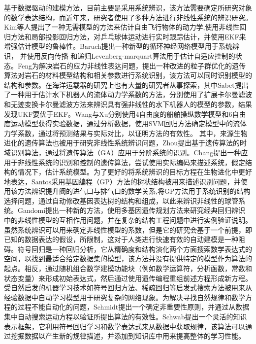 基于数据驱动的建模方法\cite{huang2015trends}，目前主要是采用系统辨识，该方法需要确定所研究对象的数学表达结构，而近年来，研究者使用了多种方法进行非线性系统的辨识研究\cite{deng2009system}。Kim\cite{kim2012estimating}等人提出了一种无需模型的方法来估计自由飞行物体的动力学,使用非线性回归方法和局部投影回归方法，对乒乓球体运动进行实时跟踪估计，并使用EKF来增强估计模型的鲁棒性。Baruch\cite{baruch2009levenberg}提出一种新型的循环神经网络模型用于系统辨识， 并使用反向传播 和递归Levenberg-marquart算法用于估计自适应控制的状态。Feng\cite{feng2006identification}为解决岩石的应力非线性表达问题，提出一种改进的粒子群优化的遗传算法对岩石的材料模型结构和相关参数进行系统识别，该方法可以同时识别模型的结构和参数。在海洋运载器的研究上也有大量的研究者从事探索\cite{luque2011auv,hegrenaes2007comparison,hong2013online}，其中Sabet\cite{sabet2014extended}提出了一种用于估计水下机器人的流体动力学系数的方法，分别使用了扩展卡尔曼滤波和无迹变换卡尔曼滤波方法来辨识具有强非线性的水下机器人的模型的参数，结果发现UKF要优于EKF。Wang\cite{wang2014sensitivity}与Xu\cite{xu2013identification}分别使用4自由度的船舶操纵数学模型和6自由度运动模型获得实验数据，通过分析数据，使用SVM回归方法确定模型中的流体力学系数，通过将预测结果与实际对比，以证明方法的有效性。
其中，来源生物进化的遗传算法也被用于研究非线性系统辨识问题，Zhou提出基于遗传算法的时域识别算法，通过将遗传算法（GA）应用于分阶系统的识别\cite{zhou2013genetic}。Chang提出一种应用于非线性系统的识别和控制的遗传算法，尝试使用实际编码来描述系统，假定结构的情况下，估计系统模型\cite{chang2007nonlinear}。为了更好的将系统辨识的目标方程在生物进化中更好地表达，Santos采用基因编程（GP）方法的树状结构被用来描述识别问题，并使用该方法辨识提升阀的进气口与排气口的数学关系,将GP方法用于系统识别的结构选择问题，通过自动修改基因表达树的结构和组成，以此来辨识非线性的球管系统\cite{dos2014genetic,dos2009nonlinear,Mcconaghy2008Genetic}。Gandomi提出一种新的方法，使用多基因遗传规划方法来研究经典回归辨识中的非线性模型的互相作用问题，并在复杂的结构工程问题中进行实例验证说明\cite{Gandomi2012A1,Gandomi2012A2}。
虽然系统辨识可以用来确定非线性模型的系数，但是它的研究会基于一个前提，即已知的数据表达的假设，所限制，这对于人类进行快速有效的自动建模是一种阻碍\cite{menezes2014symbolic}。符号回归是一种回归分析，它从精确度和结构演化两个方面搜索数学表达式的空间，以找到最适合给定数据集的模型，该方法并没有提供特定的模型作为算法的起点。相反，通过随机组合数学建模功能块（例如数学运算符，分析函数，常数和状态变量）来形成初始表达式，然后通过使用遗传编程重组前述方程形成新方程\cite{schmidt2009distilling,wu2016parametric}。
受自然启发的机器学习技术如符号回归方法、稀疏回归等启发式搜索方法被用来从经验数据中自动学习模型用于研究复杂的网络现象\cite{menezes2014symbolic,brunton2016discovering}。为解决寻找自然规律和数学方程的过程不能自动化的问题，Schmidt提出一个确定非重要性原则，并通过从数据集中自动搜索运动方程以验证所提出算法的有效性\cite{schmidt2009distilling,schmidt2010symbolic}。Schwab提出一个灵活的知识表示框架，它利用符号回归学习和数学表达式来从数据中获取规律，该算法可以通过挖掘数据以产生新的规律描述，并添加到知识库中用来提高整体的学习性能\cite{schwab2012learn}。
